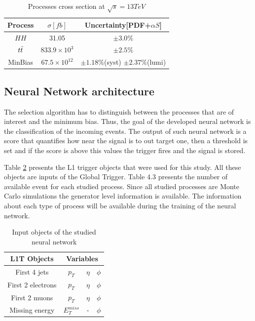 \documentclass[../../main.tex]{subfiles}
\begin{document}
\begin{center}
    \begin{table}[h]
    \centering
    \begin{tabular}{|c|c|c|}
        \hline
        Process & $\sigma[fb]$ & Uncertainty[PDF+$\alpha S$] \\
        \hline
        $HH$         & 31.05 & $\pm 3.0 \%$ \\
        $t\Bar {t}$  & $833.9\times 10^{3}$ & $\pm 2.5 \%$ \\
        MinBias & $67.5\times 10^{12}$ & $\pm 1.18 \%$(syst) $\pm 2.37 \%$(lumi) \\
        \hline
    \end{tabular}
    \caption{Processes cross section at $\sqrt{s}=13TeV$}
    \label{tab:cross_sec_table}
    \end{table}
\end{center}

\subsection{Neural Network architecture}
\label{P2GT_NN}
The selection algorithm has to distinguish between the processes that are of interest and the minimum bias. Thus, the goal of the developed neural network is the classification of the incoming events. The output of such neural network is a score that quantifies how near the signal is to out target one, then a threshold is set and if the score is above this values the trigger fires and the signal is stored. 

Table \ref{tab:Input_obj} presents the L1 trigger objects that were used for this study.
All these objects are inputs of the Global Trigger. Table 4.3 presents the number of
available event for each studied process. Since all studied processes are Monte Carlo
simulations the generator level information is available. The information about each
type of process will be available during the training of the neural network.

\begin{center}
    \begin{table}[h]
    \centering
    \begin{tabular}{|c|c|c|c|}
        \hline
        L1T Objects & \multicolumn{3}{c|}{Variables} \\
        \hline
        First 4 jets        & $p_T$ & $\eta$ & $\phi$ \\
        First 2 electrons   & $p_T$ & $\eta$ & $\phi$ \\
        First 2 muons       & $p_T$ & $\eta$ & $\phi$ \\
        Missing energy      & $E_T^{miss}$ & -      & $\phi$ \\
        \hline
    \end{tabular}
    \caption{Input objects of the studied neural network}
    \label{tab:Input_obj}
    \end{table}
\end{center}
\end{document}
